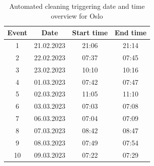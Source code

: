 \begin{table}[H]
\centering
\caption{Automated cleaning triggering date and time overview for Oslo}
\label{tab:AC_dateandtimeOslo}
\begin{tabular}{|c|c|c|c|}
\hline
\textbf{Event} & \textbf{Date} & \textbf{Start time} & \textbf{End time} \\ \hline
1              & 21.02.2023         & 21:06               & 21:14             \\ \hline
2              & 22.02.2023         & 07:37               & 07:45             \\ \hline
3              & 23.02.2023         & 10:10               & 10:16             \\ \hline
4              & 01.03.2023         & 07:42               & 07:47             \\ \hline
5              & 02.03.2023         & 11:05               & 11:10             \\ \hline
6              & 03.03.2023         & 07:03               & 07:08             \\ \hline
7              & 06.03.2023         & 07:04               & 07:09             \\ \hline
8              & 07.03.2023         & 08:42               & 08:47             \\ \hline
9              & 08.03.2023         & 07:49               & 07:54             \\ \hline
10             & 09.03.2023         & 07:22               & 07:29             \\ \hline
\end{tabular}
\end{table}

